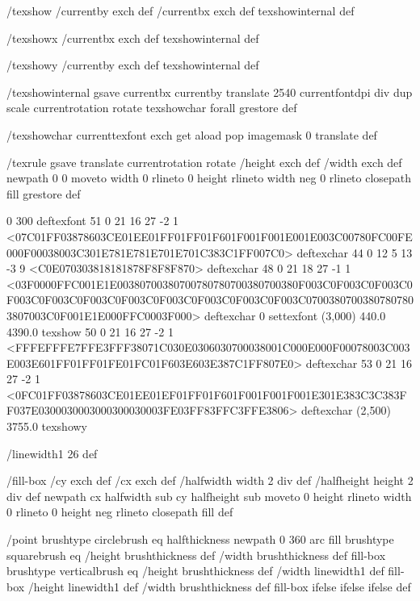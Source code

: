 /texshow
 { /currentby exch def
   /currentbx exch def
   texshowinternal } def

/texshowx
 { /currentbx exch def
   texshowinternal } def

/texshowy
 { /currentby exch def
   texshowinternal } def

/texshowinternal
 { gsave
   currentbx currentby translate
   2540 currentfontdpi div dup scale
   currentrotation rotate
   {texshowchar} forall
   grestore } def

/texshowchar
   { currenttexfont exch get aload pop imagemask 0 translate } def

/texrule
 { gsave
   translate
   currentrotation rotate
   /height exch def
   /width exch def
   newpath
    0 0 moveto
    width 0 rlineto
    0 height rlineto
    width neg 0 rlineto
    closepath
    fill
   grestore } def

0 300 deftexfont
51 0 21 16 27 -2 1 {{<07C01FF03878603CE01EE01FF01FF01F601F001F001E001E003C00780FC00FE000F00038003C301E781E781E701E701C383C1FF007C0>}} deftexchar
44 0 12 5 13 -3 9 {{<C0E070303818181878F8F8F870>}} deftexchar
48 0 21 18 27 -1 1 {{<03F0000FFC001E1E00380700380700780780700380700380F003C0F003C0F003C0F003C0F003C0F003C0F003C0F003C0F003C0F003C0F003C07003807003807807803807003C0F001E1E000FFC0003F000>}} deftexchar
0 settexfont
(3,000) 440.0 4390.0 texshow
50 0 21 16 27 -2 1 {{<FFFEFFFE7FFE3FFF38071C030E0306030700038001C000E000F00078003C003E003E601FF01FF01FE01FC01F603E603E387C1FF807E0>}} deftexchar
53 0 21 16 27 -2 1 {{<0FC01FF03878603CE01EE01EF01FF01F601F001F001F001E301E383C3C383FF037E0300030003000300030003FE03FF83FFC3FFE3806>}} deftexchar
(2,500) 3755.0 texshowy



/linewidth1 26 def

/fill-box
  { /cy exch def /cx exch def
    /halfwidth width 2 div def
    /halfheight height 2 div def
    newpath
     cx halfwidth sub cy halfheight sub moveto
     0 height rlineto
     width 0 rlineto
     0 height neg rlineto
     closepath
     fill } def

/point
  { brushtype circlebrush eq
     { halfthickness newpath 0 360 arc fill }
     { brushtype squarebrush eq
        { /height brushthickness def
	  /width brushthickness def
	  fill-box }
        { brushtype verticalbrush eq
           { /height brushthickness def
	     /width linewidth1 def
	     fill-box }
           { /height linewidth1 def
	     /width brushthickness def
	     fill-box }
	   ifelse }
        ifelse }
     ifelse } def

